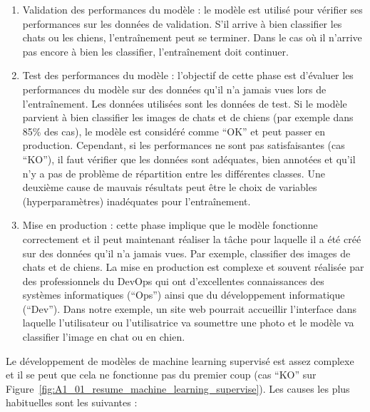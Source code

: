 \begin{enumerate}
    \item Validation des performances du modèle : le modèle est utilisé pour vérifier ses performances sur les données de validation. S'il arrive à bien classifier les chats ou les chiens, l’entraînement peut se terminer. Dans le cas où il n'arrive pas encore à bien les classifier, l’entraînement doit continuer.
    
    \item Test des performances du modèle : l'objectif de cette phase est d'évaluer les performances du modèle sur des données qu'il n'a jamais vues lors de l'entraînement. Les données utilisées sont les données de test. Si le modèle parvient à bien classifier les images de chats et de chiens (par exemple dans 85\% des cas), le modèle est considéré comme ``OK'' et peut passer en production. Cependant, si les performances ne sont pas satisfaisantes (cas ``KO''), il faut vérifier que les données sont adéquates, bien annotées et qu'il n'y a pas de problème de répartition entre les différentes classes. Une deuxième cause de mauvais résultats peut être le choix de variables (hyperparamètres) inadéquates pour l’entraînement.
    
    \item Mise en production : cette phase implique que le modèle fonctionne correctement et il peut maintenant réaliser la tâche pour laquelle il a été créé sur des données qu'il n'a jamais vues. Par exemple, classifier des images de chats et de chiens. La mise en production est complexe et souvent réalisée par des professionnels du DevOps qui ont d'excellentes connaissances des systèmes informatiques (``Ops'') ainsi que du développement informatique (``Dev''). Dans notre exemple, un site web pourrait accueillir l'interface dans laquelle l'utilisateur ou l'utilisatrice va soumettre une photo et le modèle va classifier l'image en chat ou en chien.
\end{enumerate}

\par{Le développement de modèles de machine learning supervisé est assez complexe et il se peut que cela ne fonctionne pas du premier coup (cas ``KO'' sur Figure~\ref{fig:A1_01_resume_machine_learning_supervise}). Les causes les plus habituelles sont les suivantes :}


